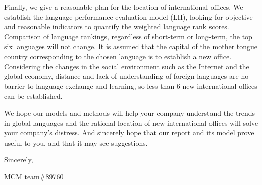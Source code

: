 Finally, we give a reasonable plan for the location of international offices. We establish the language performance evaluation model (LII), looking for objective and reasonable indicators to quantify the weighted language rank scores. Comparison of language rankings, regardless of short-term or long-term, the top six languages will not change. It is assumed that the capital of the mother tongue country corresponding to the chosen language is to establish a new office. Considering the changes in the social environment such as the Internet and the global economy, distance and lack of understanding of foreign languages are no barrier to language exchange and learning, so less than 6 new international offices can be established.

We hope our models and methods will help your company understand the trends in global languages and the rational location of new international offices will solve your company's distress. And sincerely hope that our report and its model prove useful to you, and that it may see suggestions.

Sincerely,

MCM team\#89760


